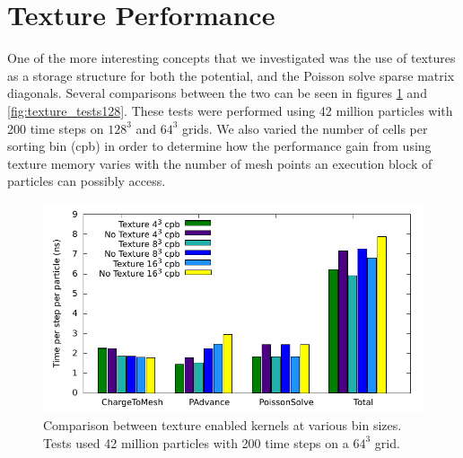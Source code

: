 	\section{Texture Performance}

One of the more interesting concepts that we investigated was the use of textures as a storage structure for both the potential, and the Poisson solve sparse matrix diagonals. Several comparisons between the two can be seen in figures \ref{fig:texture_tests64} and \ref{fig:texture_tests128}. These tests were performed using 42 million particles with 200 time steps on $128^3$ and $64^3$ grids. We also varied the number of cells per sorting bin (cpb) in order to determine how the performance gain from using texture memory varies with the number of mesh points an execution block of particles can possibly access.

\begin{figure}
\begin{center}
\includegraphics[width=6in]{performance/texture_tests64.pdf}
\end{center}
\caption[Comparison between texture enabled kernels on a $64^3$ grid]{Comparison between texture enabled kernels at various bin sizes. Tests used 42 million particles with 200 time steps on a $64^3$ grid.}
\label{fig:texture_tests64}
\end{figure}

